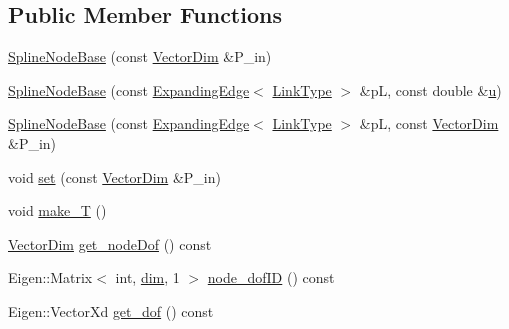 \subsection*{Public Member Functions}
\begin{DoxyCompactItemize}
\item 
\hyperlink{classmodel_1_1_spline_node_base_3_01_derived_00_01dim_00_011_00_01_catmull_rom_01_4_a5f5c6600d0b445d6d704b574c15ec2d7}{Spline\+Node\+Base} (const \hyperlink{_spline_enums_8h_ad5cfc23fc5c8569885db746e503c2e14}{Vector\+Dim} \&P\+\_\+in)
\item 
\hyperlink{classmodel_1_1_spline_node_base_3_01_derived_00_01dim_00_011_00_01_catmull_rom_01_4_a9cb49b4b30fd7f846969e8b52a7f8b24}{Spline\+Node\+Base} (const \hyperlink{structmodel_1_1_expanding_edge}{Expanding\+Edge}$<$ \hyperlink{_spline_node_base__corder0_8h_ab09ccc0af6ea9402dfef7b0eac55cff3}{Link\+Type} $>$ \&p\+L, const double \&\hyperlink{angle_axis_8m_a52688d77a393e5a594a1e82658e634b6}{u})
\item 
\hyperlink{classmodel_1_1_spline_node_base_3_01_derived_00_01dim_00_011_00_01_catmull_rom_01_4_a5b5d2fb0ac5a013bd9d279e4da10c6b5}{Spline\+Node\+Base} (const \hyperlink{structmodel_1_1_expanding_edge}{Expanding\+Edge}$<$ \hyperlink{_spline_node_base__corder0_8h_ab09ccc0af6ea9402dfef7b0eac55cff3}{Link\+Type} $>$ \&p\+L, const \hyperlink{_spline_enums_8h_ad5cfc23fc5c8569885db746e503c2e14}{Vector\+Dim} \&P\+\_\+in)
\item 
void \hyperlink{classmodel_1_1_spline_node_base_3_01_derived_00_01dim_00_011_00_01_catmull_rom_01_4_a5bdd76ce45551a1974b18e6b4ed0fb44}{set} (const \hyperlink{_spline_enums_8h_ad5cfc23fc5c8569885db746e503c2e14}{Vector\+Dim} \&P\+\_\+in)
\item 
void \hyperlink{classmodel_1_1_spline_node_base_3_01_derived_00_01dim_00_011_00_01_catmull_rom_01_4_a1cd22817c7019db124e4256c112eb9c7}{make\+\_\+\+T} ()
\item 
\hyperlink{_spline_enums_8h_ad5cfc23fc5c8569885db746e503c2e14}{Vector\+Dim} \hyperlink{classmodel_1_1_spline_node_base_3_01_derived_00_01dim_00_011_00_01_catmull_rom_01_4_a585e36cf97961fce0f1230306e3873bc}{get\+\_\+node\+Dof} () const 
\item 
Eigen\+::\+Matrix$<$ int, \hyperlink{plot_nd_a_8m_a382f3ca768b275b8d563604f7fc7df73}{dim}, 1 $>$ \hyperlink{classmodel_1_1_spline_node_base_3_01_derived_00_01dim_00_011_00_01_catmull_rom_01_4_ab6a5fc188b4ce85bb9c4f68edae73013}{node\+\_\+dof\+I\+D} () const 
\item 
Eigen\+::\+Vector\+Xd \hyperlink{classmodel_1_1_spline_node_base_3_01_derived_00_01dim_00_011_00_01_catmull_rom_01_4_a51fe0f7b5d1c26ff7137214904bf6353}{get\+\_\+dof} () const 

\end{DoxyCompactItemize}

